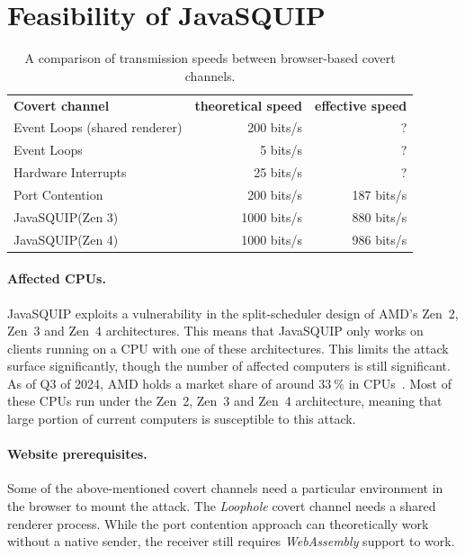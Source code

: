\documentclass[11pt,
  titlepage=false,
  parskip=half,      %
]{scrreprt}
\begin{document}
\section{Feasibility of JavaSQUIP}


\begin{table}[t]
\centering
\begin{tabular}{ |l|r|r| }
\hline
\textbf{Covert channel} & \textbf{theoretical speed} & \textbf{effective speed} \\
\Xhline{2pt}
Event Loops (shared renderer) & 200 bits/s & ? \\
\hline
Event Loops & 5 bits/s & ? \\
\hline
Hardware Interrupts & 25 bits/s & ? \\
\hline
Port Contention & 200 bits/s & 187 bits/s \\
\hline
JavaSQUIP(Zen 3) & 1000 bits/s & 880 bits/s\\
\hline
JavaSQUIP(Zen 4) & 1000 bits/s & 986 bits/s\\
\hline
\end{tabular}

\caption{A comparison of transmission speeds between browser-based covert channels.}
\label{tab:speedcomparison}
\end{table}

\paragraph{Affected CPUs.}
JavaSQUIP exploits a vulnerability in the split-scheduler design of AMD's Zen~2, Zen~3 and Zen~4 architectures.
This means that JavaSQUIP only works on clients running on a CPU with one of these architectures.
This limits the attack surface significantly, though the number of affected computers is still significant.
As of Q3 of 2024, AMD holds a market share of around $33~\%$ in CPUs~\cite{amdmarket}.
Most of these CPUs run under the Zen~2, Zen~3 and Zen~4 architecture,
meaning that large portion of current computers is susceptible to this attack.

\paragraph{Website prerequisites.}
Some of the above-mentioned covert channels need a particular environment in the browser to mount the attack.
The \textit{Loophole} covert channel needs a shared renderer process.
While the port contention approach can theoretically work without a native sender,
the receiver still requires \textit{WebAssembly} support to work.
\end{document}
